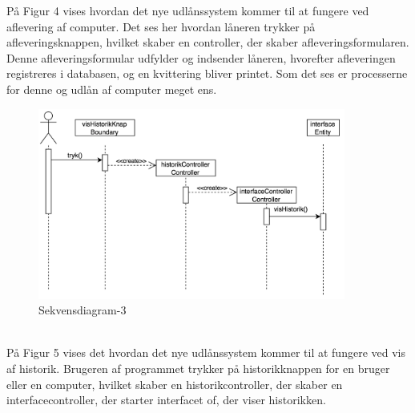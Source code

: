 \documentclass[a4paper]{article}
\begin{document}
På Figur 4 vises hvordan det nye udlånssystem kommer til at fungere ved aflevering af computer. Det ses her hvordan låneren trykker på afleveringsknappen, hvilket skaber en controller, der skaber afleveringsformularen. Denne afleveringsformular udfylder og indsender låneren, hvorefter afleveringen registreres i databasen, og en kvittering bliver printet. Som det ses er processerne for denne og udlån af computer meget ens.
\begin{figure}[h!]
\includegraphics[width=0.9\textwidth]{SekvensHistorik}
  \caption{Sekvensdiagram-3}
  \centering
\end{figure}\\
På Figur 5 vises det hvordan det nye udlånssystem kommer til at fungere ved vis af historik. Brugeren af programmet trykker på historikknappen for en bruger eller en computer, hvilket skaber en historikcontroller, der skaber en interfacecontroller, der starter interfacet of, der viser historikken. 
\newpage
\end{document}
